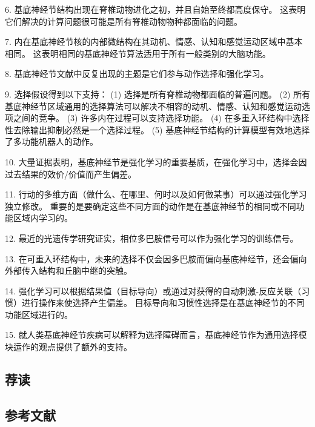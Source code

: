 6. 基底神经节结构出现在脊椎动物进化之初，并且自始至终都高度保守。 这表明它们解决的计算问题很可能是所有脊椎动物物种都面临的问题。 

7. 内在基底神经节核的内部微结构在其动机、情感、认知和感觉运动区域中基本相同。 这表明相同的基底神经节算法适用于所有一般类别的大脑功能。 

8. 基底神经节文献中反复出现的主题是它们参与动作选择和强化学习。 

9. 选择假设得到以下支持： (1) 选择是所有脊椎动物都面临的普遍问题。 (2) 所有基底神经节区域通用的选择算法可以解决不相容的动机、情感、认知和感觉运动选项之间的竞争。 (3) 许多内在过程可以支持选择功能。 (4) 在多重入环结构中选择性去除输出抑制必然是一个选择过程。 (5) 基底神经节结构的计算模型有效地选择了多功能机器人的动作。 

10. 大量证据表明，基底神经节是强化学习的重要基质，在强化学习中，选择会因过去结果的效价/价值而产生偏差。 

11. 行动的多维方面（做什么、在哪里、何时以及如何做某事）可以通过强化学习独立修改。 重要的是要确定这些不同方面的动作是在基底神经节的相同或不同功能区域内学习的。 

12. 最近的光遗传学研究证实，相位多巴胺信号可以作为强化学习的训练信号。 

13. 在可重入环结构中，未来的选择不仅会因多巴胺而偏向基底神经节，还会偏向外部传入结构和丘脑中继的突触。 

14. 强化学习可以根据结果值（目标导向）或通过对获得的自动刺激-反应关联（习惯）进行操作来使选择产生偏差。 目标导向和习惯性选择是在基底神经节的不同功能区域进行的。 

15. 就人类基底神经节疾病可以解释为选择障碍而言，基底神经节作为通用选择模块运作的观点提供了额外的支持。

\subsection{荐读}
\subsection{参考文献}
